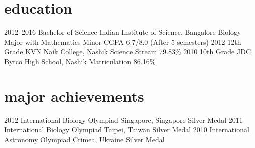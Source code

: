 \documentclass[11pt]{friggeri-cv}
\begin{document}
\section{education}

\begin{entrylist}
  \entryy
    {2012--2016}
    {Bachelor of Science}
    {Indian Institute of Science, Bangalore}
    {Biology Major with Mathematics Minor \hspace{2em}
     CGPA 6.7/8.0  (After 5 semesters)}
  \entryy
    {2012}
    {12th Grade}
    {KVN Naik College, Nashik}
    {Science Stream \hspace{2em} 
      79.83\%}
  \entryy
    {2010}
    {10th Grade}
    {JDC Bytco High School, Nashik}
    {Matriculation \hspace{2em}    
    86.16\%}

\end{entrylist}


\section{major achievements}
\begin{entrylist}
  \entryy
    {2012}
    {International Biology Olympiad}
    {Singapore, Singapore}
    {Silver Medal}
  \entryy
    {2011}
    {International Biology Olympiad}
    {Taipei, Taiwan}
    {Silver Medal}
  \entryy
    {2010}
    {International Astronomy Olympiad}
    {Crimea, Ukraine}
    {Silver Medal}



\end{entrylist}
\end{document}
